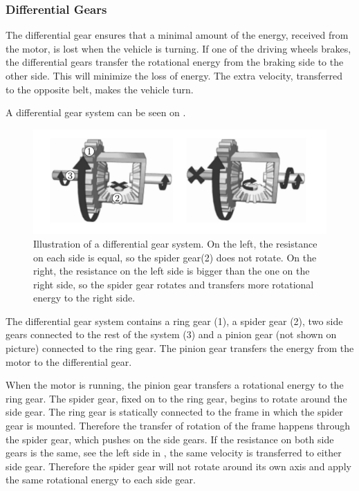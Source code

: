 \subsubsection{Differential Gears} \label{sec:Differentialgears}
The differential gear ensures that a minimal amount of the energy, received from the motor, is lost when the vehicle is turning. If one of the driving wheels brakes, the differential gears transfer the rotational energy from the braking side to the other side. This will minimize the loss of energy. The extra velocity, transferred to the opposite belt, makes the vehicle turn.

A differential gear system can be seen on .

\begin{figure}[H]
	\centering
	\includegraphics[scale=0.7]{figures/diffGearLightGray.pdf}
	\caption{Illustration of a differential gear system. On the left, the resistance on each side is equal, so the spider gear(2) does not rotate. On the right, the resistance on the left side is bigger than the one on the right side, so the spider gear rotates and transfers more rotational energy to the right side. \cite{MechanicalEngineering}}
	\label{diffGearLight}
\end{figure}\vspace{-5mm}

The differential gear system contains a ring gear (1), a spider gear (2), two side gears connected to the rest of the system (3) and a pinion gear (not shown on picture) connected to the ring gear. The pinion gear transfers the energy from the motor to the differential gear.

When the motor is running, the pinion gear transfers a rotational energy to the ring gear. The spider gear, fixed on to the ring gear, begins to rotate around the side gear. The ring gear is statically connected to the frame in which the spider gear is mounted. Therefore the transfer of rotation of the frame happens through the spider gear, which pushes on the side gears. If the resistance on both side gears is the same, see the left side in , the same velocity is transferred to either side gear. Therefore the spider gear will not rotate around its own axis and apply the same rotational energy to each side gear.

